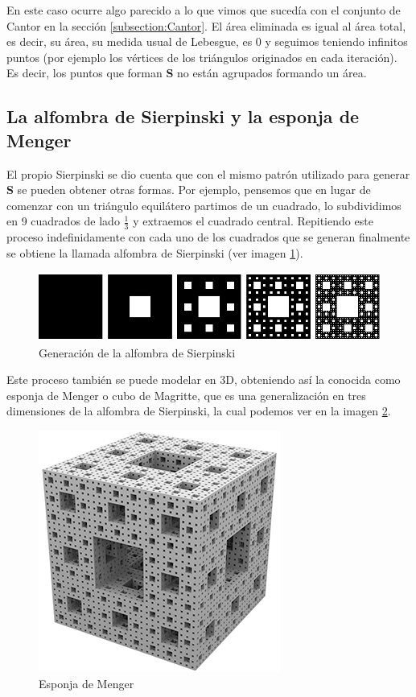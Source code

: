En este caso ocurre algo parecido a lo que vimos que sucedía con el conjunto de Cantor en la sección \ref{subsection:Cantor}. El área eliminada es igual al área total, es decir, su área, su medida usual de Lebesgue, es 0 y seguimos teniendo infinitos puntos (por ejemplo los vértices de los triángulos originados en cada iteración). Es decir, los puntos que forman \textbf{S} no están agrupados formando un área.

\subsection{La alfombra de Sierpinski y la esponja de Menger}
\label{subsection:alfombra-esponja}

El propio Sierpinski se dio cuenta que con el mismo patrón utilizado para generar \textbf{S} se pueden obtener otras formas. Por ejemplo, pensemos que en lugar de comenzar con un triángulo equilátero partimos de un cuadrado, lo subdividimos en 9 cuadrados de lado $\frac 1 3$ y extraemos el cuadrado central. Repitiendo este proceso indefinidamente con cada uno de los cuadrados que se generan finalmente se obtiene la llamada alfombra de Sierpinski (ver imagen \ref{fig:alfombra-Sierpinski}).

\begin{figure} [ht]
\centering
\includegraphics[scale = 0.6]{img/Sierpinski-carpet.png}
\caption{Generación de la alfombra de Sierpinski}
 \label{fig:alfombra-Sierpinski}
\end{figure}

Este proceso también se puede modelar en 3D, obteniendo así la conocida como esponja de Menger o cubo de Magritte, que es una generalización en tres dimensiones de la alfombra de Sierpinski, la cual podemos ver en la imagen \ref{fig:esponja-menger}.

\begin{figure} [ht]
\centering
\includegraphics[scale = 0.6]{img/esponja_menger.png}
\caption{Esponja de Menger}
 \label{fig:esponja-menger}
\end{figure}

